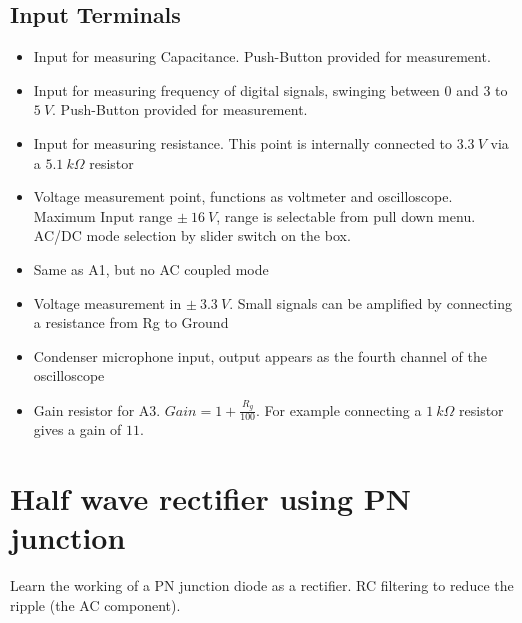 \documentclass[a4paper,12pt,english]{sphinxmanual}
\begin{document}
\subsection{Input Terminals}
\label{\detokenize{3.0:input-terminals}}\begin{itemize}
\item {} 
 Input for measuring Capacitance. Push-Button provided for
measurement.

\item {} 
 Input for measuring frequency of digital signals, swinging
between \(0\) and \(3\) to \(5\ V\).
Push-Button provided for measurement.

\item {} 
 Input for measuring resistance. This point is internally
connected to \(3.3\ V\) via a \(5.1\ k\Omega\) resistor

\item {} 
 Voltage measurement point, functions as voltmeter and
oscilloscope. Maximum Input range \(\pm\ 16\ V\), range is selectable
from pull down menu. AC/DC mode selection by slider switch on the
box.

\item {} 
 Same as A1, but no AC coupled mode

\item {} 
 Voltage measurement in \(\pm\ 3.3\ V\). Small signals can
be amplified by connecting a resistance from Rg to Ground

\item {} 
 Condenser microphone input, output appears as the fourth
channel of the oscilloscope

\item {} 
 Gain resistor for A3. \(Gain = 1 + \frac{R_{g}}{100}\).
For example connecting a \(1\ k\Omega\) resistor gives a gain of
\(11\).

\end{itemize}


\section{Half wave rectifier using PN junction}
\label{\detokenize{3.1:half-wave-rectifier-using-pn-junction}}\label{\detokenize{3.1::doc}}

Learn the working of a PN junction diode as a rectifier. RC filtering to
reduce the ripple (the AC component).
\end{document}
